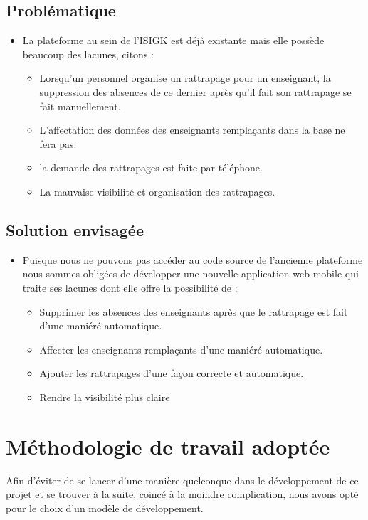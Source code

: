 \documentclass[12 pt ]{report}
\begin{document}
\subsection{Problématique }
\begin{itemize}[font=\color{black} \Large, label=]
\item La plateforme au sein de l'ISIGK est déjà existante mais elle possède beaucoup des lacunes, citons :
\begin{itemize}[font=\color{red} \Large, label=]

	\item Lorsqu’un personnel organise un rattrapage pour un enseignant, la suppression des absences de ce dernier après qu'il fait son rattrapage se fait manuellement.
	\item L'affectation  des données des enseignants remplaçants dans la base ne fera pas.
	\item la demande des rattrapages est faite par téléphone.

	\item La mauvaise visibilité et organisation des rattrapages.
\end{itemize}
\end{itemize}
\subsection{Solution envisagée}
\begin{itemize}[font=\color{black} \Large, label=]
\item Puisque nous ne pouvons pas accéder au code source de l’ancienne plateforme nous sommes obligées de développer une nouvelle application web-mobile qui traite ses lacunes dont elle offre la possibilité de : 
\begin{itemize}[font=\color{green} \Large, label=]

	\item 	Supprimer les absences des enseignants après que le rattrapage est fait d’une maniéré automatique.
	\item 	Affecter les enseignants remplaçants d’une maniéré automatique.
	\item Ajouter les rattrapages d'une façon correcte et automatique.
	\item 	Rendre la visibilité plus claire 
\end{itemize}
\end{itemize}
\section{Méthodologie de travail adoptée }
Afin d’éviter de se lancer d’une manière quelconque dans le développement de ce projet et se trouver à la suite, coincé à la moindre complication, nous avons opté pour le choix d’un modèle de développement.
\end{document}
